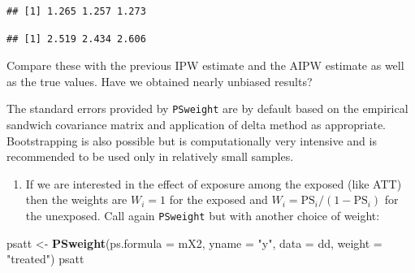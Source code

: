 \documentclass[
]{book}
\newenvironment{Shaded}{\begin{snugshade}}{\end{snugshade}}
\newcommand{\AttributeTok}[1]{\textcolor[rgb]{0.13,0.29,0.53}{#1}}
\newcommand{\DecValTok}[1]{\textcolor[rgb]{0.00,0.00,0.81}{#1}}
\newcommand{\FunctionTok}[1]{\textcolor[rgb]{0.13,0.29,0.53}{\textbf{#1}}}
\newcommand{\NormalTok}[1]{#1}
\newcommand{\OtherTok}[1]{\textcolor[rgb]{0.56,0.35,0.01}{#1}}
\newcommand{\SpecialCharTok}[1]{\textcolor[rgb]{0.81,0.36,0.00}{\textbf{#1}}}
\newcommand{\StringTok}[1]{\textcolor[rgb]{0.31,0.60,0.02}{#1}}
\providecommand{\tightlist}{%
  \setlength{\itemsep}{0pt}\setlength{\parskip}{0pt}}
\begin{document}
\begin{Shaded}
\end{Shaded}

\begin{verbatim}
## [1] 1.265 1.257 1.273
\end{verbatim}

\begin{Shaded}
\end{Shaded}

\begin{verbatim}
## [1] 2.519 2.434 2.606
\end{verbatim}

Compare these with the previous IPW estimate and the AIPW estimate as
well as the true values. Have we obtained nearly unbiased results?

The standard errors provided by \texttt{PSweight} are by default based on the
empirical sandwich covariance matrix and application of delta method as
appropriate. Bootstrapping is also possible but is computationally very
intensive and is recommended to be used only in relatively small
samples.

\begin{enumerate}
\def\labelenumi{\arabic{enumi}.}
\setcounter{enumi}{3}
\tightlist
\item
  If we are interested in the effect of exposure among the exposed
  (like ATT) then the weights are \(W_i = 1\) for the exposed and
  \(W_i = \text{PS}_i/(1-\text{PS}_i)\) for the unexposed. Call again
  \texttt{PSweight} but with another choice of weight:
\end{enumerate}

\begin{Shaded}
\begin{Highlighting}[]
\NormalTok{psatt }\OtherTok{\textless{}{-}} \FunctionTok{PSweight}\NormalTok{(}\AttributeTok{ps.formula =}\NormalTok{ mX2, }\AttributeTok{yname =} \StringTok{"y"}\NormalTok{, }\AttributeTok{data =}\NormalTok{ dd, }\AttributeTok{weight =} \StringTok{"treated"}\NormalTok{)}
\NormalTok{psatt}
\end{Highlighting}
\end{Shaded}
\end{document}
